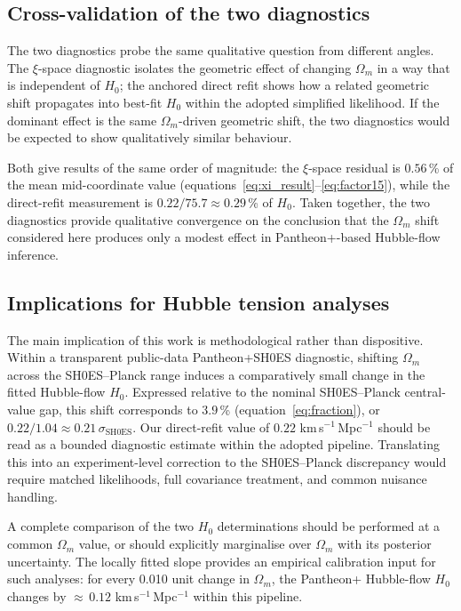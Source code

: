 \documentclass[fleqn,usenatbib,useAMS]{mnras}
\begin{document}
\subsection{Cross-validation of the two diagnostics}

The two diagnostics probe the same qualitative question from
different angles.
The $\xi$-space diagnostic isolates the geometric effect of
changing $\Omega_m$ in a way that is independent of $H_0$; the
anchored direct refit shows how a related geometric shift propagates
into best-fit $H_0$ within the adopted simplified likelihood.
If the dominant effect is the same $\Omega_m$-driven geometric shift,
the two diagnostics would be expected to show qualitatively similar
behaviour.

Both give results of the same order of magnitude:
the $\xi$-space residual is $0.56$\,\% of the mean mid-coordinate value
(equations~\ref{eq:xi_result}--\ref{eq:factor15}),
while the direct-refit measurement is
$0.22/75.7 \approx 0.29$\,\% of $H_0$.
Taken together, the two diagnostics provide qualitative convergence
on the conclusion that the $\Omega_m$ shift considered here produces
only a modest effect in Pantheon+-based Hubble-flow inference.

\subsection{Implications for Hubble tension analyses}

The main implication of this work is methodological rather than
dispositive.
Within a transparent public-data Pantheon+SH0ES diagnostic,
shifting $\Omega_m$ across the SH0ES--Planck range induces a
comparatively small change in the fitted Hubble-flow $H_0$.
Expressed relative to the nominal SH0ES--Planck central-value gap,
this shift corresponds to $3.9$\,\%
(equation~\ref{eq:fraction}), or
$0.22/1.04 \approx 0.21\,\sigma_\mathrm{SH0ES}$.
Our direct-refit value of $0.22$ km\,s$^{-1}$\,Mpc$^{-1}$ should
be read as a bounded diagnostic estimate within the adopted
pipeline.
Translating this into an experiment-level correction to the
SH0ES--Planck discrepancy would require matched likelihoods, full
covariance treatment, and common nuisance handling.

A complete comparison of the two $H_0$ determinations should
be performed at a common $\Omega_m$ value, or should explicitly
marginalise over $\Omega_m$ with its posterior uncertainty.
The locally fitted slope provides an empirical calibration input
for such analyses: for every 0.010 unit change in $\Omega_m$,
the Pantheon+ Hubble-flow $H_0$ changes by
${\approx}\,0.12$ km\,s$^{-1}$\,Mpc$^{-1}$ within this pipeline.
\end{document}
